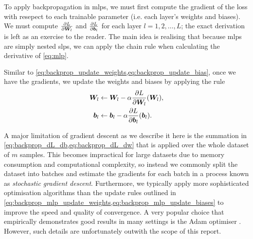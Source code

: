 \documentclass[../report.tex]{subfiles}
\begin{document}
\subsubsection{}
\label{sec:mlp_training}
To apply backpropagation in \glspl{mlp}, we must first compute the gradient of the loss with resepect to each trainable parameter (i.e. each layer's weights and biases).
We must compute $\frac{\partial L}{\partial {\bm{W}}_l}$ and $\frac{\partial L}{\partial {\bm{b}}_l}$ for each layer $l=1,2,\dots,L$; the exact derivation is left as an exercise to the reader.
The main idea is realising that because \glspl{mlp} are simply nested \glspl{slp}, we can apply the chain rule when calculating the derivative of \cref{eq:mlp}.

Similar to \cref{eq:backprop_update_weights,eq:backprop_update_bias}, once we have the gradients, we update the weights and biases by applying the rule
\begin{align}
    \label{eq:backprop_mlp_update_weights}
    {\bm{W}}_l &\gets {\bm{W}}_l - \alpha \frac{\partial L}{\partial {\bm{W}}_l}({\bm{W}}_l),\\
    \label{eq:backprop_mlp_update_biases}
    {\bm{b}}_l &\gets {\bm{b}}_l - \alpha \frac{\partial L}{\partial {\bm{b}}_l}({\bm{b}}_l).
\end{align}

A major limitation of gradient descent as we describe it here is the summation in \cref{eq:backprop_dL_db,eq:backprop_dL_dw} that is applied over the whole dataset of $m$ samples. 
This becomes impractical for large datasets due to memory consumption and computational complexity, so instead we commonly split the dataset into batches and estimate the gradients for each batch in a process known as \emph{stochastic gradient descent}.
Furthermore, we typically apply more sophisticated optimisation algorithms than the update rules outlined in \cref{eq:backprop_mlp_update_weights,eq:backprop_mlp_update_biases} to improve the speed and quality of convergence.
A very popular choice that empirically demonstrates good results in many settings is the Adam optimiser \cite{kingma2017}.
However, such details are unfortunately outwith the scope of this report.
\end{document}
